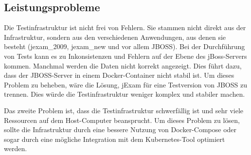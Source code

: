 \subsection{Leistungsprobleme}

Die Testinfrastruktur ist nicht frei von Fehlern. Sie stammen nicht
direkt aus der Infrastruktur, sondern aus den verschiedenen
Anwendungen, aus denen sie besteht (\Gls{jexam_2009}, \Gls{jexam_new} und vor
allem JBOSS). Bei der Durchführung von Tests kann es zu Inkonsistenzen
und Fehlern auf der Ebene des jBoss-Servers kommen. Manchmal werden
die Daten nicht korrekt angezeigt. Dies führt dazu, dass der
JBOSS-Server in einem Docker-Container nicht stabil ist. Um dieses
Problem zu beheben, wäre die Lösung, jExam für eine Testversion von
JBOSS zu trennen. Dies würde die Testinfrastruktur weniger komplex
und stabiler machen.

Das zweite Problem ist, dass die Testinfrastruktur schwerfällig ist
und sehr viele Ressourcen auf dem Host-Computer beansprucht. Um dieses
Problem zu lösen, sollte die Infrastruktur durch eine bessere Nutzung
von Docker-Compose oder sogar durch eine mögliche Integration mit dem
Kubernetes-Tool optimiert werden.

